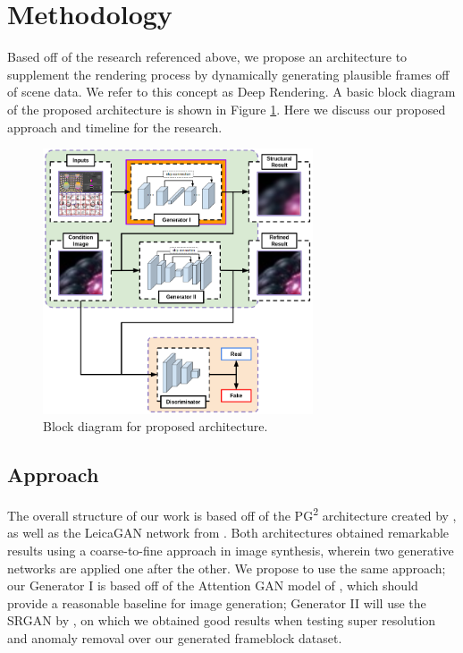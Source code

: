\documentclass{article}
\begin{document}
\section{Methodology}
\label{sec:methodology}
Based off of the research referenced above,
we propose an architecture to supplement the rendering process by dynamically
generating plausible frames off of scene data. We refer to this concept as
Deep Rendering. A basic block diagram of the proposed architecture is shown
in Figure \ref{fig:block_diagram}. Here we discuss our proposed approach and
timeline for the research.

\begin{figure}[htbp]
\centerline{\includegraphics[width=8cm]{block_diagram.png}}
\caption{Block diagram for proposed architecture.}
\label{fig:block_diagram}
\end{figure}

\subsection{Approach}
\label{subsec:approach}
The overall structure of our work is
based off of the PG\textsuperscript{2} architecture created by
\cite{pose_guided_image_generation}, as well as the LeicaGAN network
from \cite{leica}. Both architectures obtained remarkable results using
a coarse-to-fine approach in image synthesis, wherein two generative networks
are applied one after the other. We propose to use the same approach;
our Generator I is based off of the Attention GAN model of \cite{attngan},
which should provide a reasonable baseline for image generation;
Generator II will use the SRGAN by \cite{srgan}, on which we
obtained good results when testing super resolution and anomaly removal
over our generated frameblock dataset.
\end{document}
